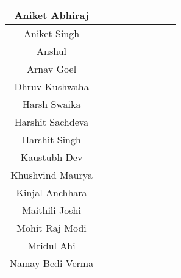 \begin{center}
\begin{longtable}{|c|c|c|c|c|c|p{1.2cm}|c|c|}
Aniket Abhiraj    & \cellcolor[HTML]{92D050} & \cellcolor[HTML]{92D050} & \cellcolor[HTML]{F2F2F2} & \cellcolor[HTML]{F2F2F2} \\ \hline
Aniket Singh      & \cellcolor[HTML]{92D050} & \cellcolor[HTML]{00B050} & \cellcolor[HTML]{F2F2F2} & \cellcolor[HTML]{FFC000} \\ \hline
Anshul            & \cellcolor[HTML]{FFFF00} & \cellcolor[HTML]{FFFF00} & \cellcolor[HTML]{F2F2F2} & \cellcolor[HTML]{FFC000} \\ \hline
Arnav Goel        & \cellcolor[HTML]{92D050} & \cellcolor[HTML]{92D050} & \cellcolor[HTML]{F2F2F2} & \cellcolor[HTML]{FFC000} \\ \hline
Dhruv Kushwaha    & \cellcolor[HTML]{92D050} & \cellcolor[HTML]{00B050} & \cellcolor[HTML]{F2F2F2} & \cellcolor[HTML]{F2F2F2} \\ \hline
Harsh Swaika      & \cellcolor[HTML]{92D050} & \cellcolor[HTML]{92D050} & \cellcolor[HTML]{FFC000} & \cellcolor[HTML]{F2F2F2} \\ \hline
Harshit Sachdeva  & \cellcolor[HTML]{92D050} & \cellcolor[HTML]{FFFF00} & \cellcolor[HTML]{F2F2F2} & \cellcolor[HTML]{F2F2F2} \\ \hline
Harshit Singh     & \cellcolor[HTML]{92D050} & \cellcolor[HTML]{00B050} & \cellcolor[HTML]{FFC000} & \cellcolor[HTML]{F2F2F2} \\ \hline
Kaustubh Dev      & \cellcolor[HTML]{FFFF00} & \cellcolor[HTML]{92D050} & \cellcolor[HTML]{FFC000} & \cellcolor[HTML]{F2F2F2} \\ \hline
Khushvind Maurya  & \cellcolor[HTML]{92D050} & \cellcolor[HTML]{92D050} & \cellcolor[HTML]{F2F2F2} & \cellcolor[HTML]{F2F2F2} \\ \hline
Kinjal Anchhara   & \cellcolor[HTML]{92D050} & \cellcolor[HTML]{00B050} & \cellcolor[HTML]{F2F2F2} & \cellcolor[HTML]{F2F2F2} \\ \hline
Maithili Joshi    & \cellcolor[HTML]{92D050} & \cellcolor[HTML]{00B050} & \cellcolor[HTML]{F2F2F2} & \cellcolor[HTML]{F2F2F2} \\ \hline
Mohit Raj Modi    & \cellcolor[HTML]{92D050} & \cellcolor[HTML]{92D050} & \cellcolor[HTML]{F2F2F2} & \cellcolor[HTML]{F2F2F2} \\ \hline
Mridul Ahi        & \cellcolor[HTML]{FFFF00} & \cellcolor[HTML]{92D050} & \cellcolor[HTML]{FFC000} & \cellcolor[HTML]{F2F2F2} \\ \hline
Namay Bedi Verma  & \cellcolor[HTML]{92D050} & \cellcolor[HTML]{92D050} & \cellcolor[HTML]{FFC000} & \cellcolor[HTML]{F2F2F2} \\ \hline

\end{longtable}
\end{center}
